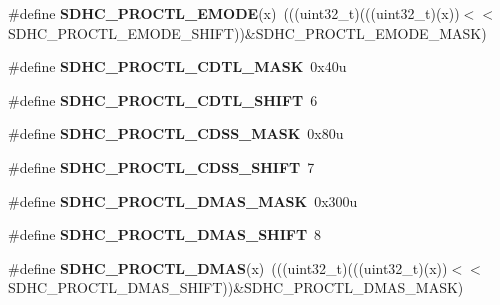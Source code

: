 \begin{DoxyCompactItemize}
\item 
\#define {\bfseries S\+D\+H\+C\+\_\+\+P\+R\+O\+C\+T\+L\+\_\+\+E\+M\+O\+DE}(x)~(((uint32\+\_\+t)(((uint32\+\_\+t)(x))$<$$<$S\+D\+H\+C\+\_\+\+P\+R\+O\+C\+T\+L\+\_\+\+E\+M\+O\+D\+E\+\_\+\+S\+H\+I\+FT))\&S\+D\+H\+C\+\_\+\+P\+R\+O\+C\+T\+L\+\_\+\+E\+M\+O\+D\+E\+\_\+\+M\+A\+SK)\hypertarget{group__SDHC__Register__Masks_ga1c3a2c1c26d5ef0ddb1b54d3ef90fd46}{}\label{group__SDHC__Register__Masks_ga1c3a2c1c26d5ef0ddb1b54d3ef90fd46}

\item 
\#define {\bfseries S\+D\+H\+C\+\_\+\+P\+R\+O\+C\+T\+L\+\_\+\+C\+D\+T\+L\+\_\+\+M\+A\+SK}~0x40u\hypertarget{group__SDHC__Register__Masks_ga8af505ec10166a4196541f055cad8907}{}\label{group__SDHC__Register__Masks_ga8af505ec10166a4196541f055cad8907}

\item 
\#define {\bfseries S\+D\+H\+C\+\_\+\+P\+R\+O\+C\+T\+L\+\_\+\+C\+D\+T\+L\+\_\+\+S\+H\+I\+FT}~6\hypertarget{group__SDHC__Register__Masks_ga84652338a2704314d7ab2381a351215c}{}\label{group__SDHC__Register__Masks_ga84652338a2704314d7ab2381a351215c}

\item 
\#define {\bfseries S\+D\+H\+C\+\_\+\+P\+R\+O\+C\+T\+L\+\_\+\+C\+D\+S\+S\+\_\+\+M\+A\+SK}~0x80u\hypertarget{group__SDHC__Register__Masks_ga4eacd6fff47090ff277ac702744032c7}{}\label{group__SDHC__Register__Masks_ga4eacd6fff47090ff277ac702744032c7}

\item 
\#define {\bfseries S\+D\+H\+C\+\_\+\+P\+R\+O\+C\+T\+L\+\_\+\+C\+D\+S\+S\+\_\+\+S\+H\+I\+FT}~7\hypertarget{group__SDHC__Register__Masks_ga9c25c726f9cf08d6cf3dc9dd8b56f02f}{}\label{group__SDHC__Register__Masks_ga9c25c726f9cf08d6cf3dc9dd8b56f02f}

\item 
\#define {\bfseries S\+D\+H\+C\+\_\+\+P\+R\+O\+C\+T\+L\+\_\+\+D\+M\+A\+S\+\_\+\+M\+A\+SK}~0x300u\hypertarget{group__SDHC__Register__Masks_ga100c5b53357ad23fabd0976fbac43ff4}{}\label{group__SDHC__Register__Masks_ga100c5b53357ad23fabd0976fbac43ff4}

\item 
\#define {\bfseries S\+D\+H\+C\+\_\+\+P\+R\+O\+C\+T\+L\+\_\+\+D\+M\+A\+S\+\_\+\+S\+H\+I\+FT}~8\hypertarget{group__SDHC__Register__Masks_ga934c05067b80924d6afa525d338e7529}{}\label{group__SDHC__Register__Masks_ga934c05067b80924d6afa525d338e7529}

\item 
\#define {\bfseries S\+D\+H\+C\+\_\+\+P\+R\+O\+C\+T\+L\+\_\+\+D\+M\+AS}(x)~(((uint32\+\_\+t)(((uint32\+\_\+t)(x))$<$$<$S\+D\+H\+C\+\_\+\+P\+R\+O\+C\+T\+L\+\_\+\+D\+M\+A\+S\+\_\+\+S\+H\+I\+FT))\&S\+D\+H\+C\+\_\+\+P\+R\+O\+C\+T\+L\+\_\+\+D\+M\+A\+S\+\_\+\+M\+A\+SK)\hypertarget{group__SDHC__Register__Masks_gab38de53d7a54fdbd16e4a485b83282af}{}\label{group__SDHC__Register__Masks_gab38de53d7a54fdbd16e4a485b83282af}


\end{DoxyCompactItemize}
